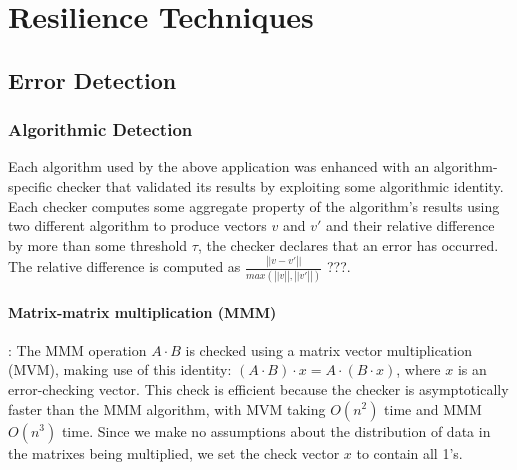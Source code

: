 \documentclass{sig-alternate}
\newcommand{\sui}[1]{%
  \textcolor{green}{SC - #1}
}
\begin{document}
\section{Resilience Techniques}
\label{sec:res_tech}

\subsection{Error Detection}
\label{sec:res_tech:err_det}

\subsubsection{Algorithmic Detection}
\label{sec:res_tech:err_det:algo}


Each algorithm used by the above application was enhanced with an algorithm-specific checker that validated its results by exploiting some algorithmic identity.
Each checker computes some aggregate property of the algorithm's results using two different algorithm to produce vectors $v$ and $v'$ and their relative difference by more than some threshold $\tau$, the checker declares that an error has occurred.
The relative difference is computed as $\frac{\left|| v-v' \right||}{max(\left||v\right||, \left||v'\right||)}$ ???.

\paragraph{Matrix-matrix multiplication (MMM)}:
The MMM operation $A \cdot B$ is checked using a matrix vector multiplication (MVM), making use of this identity: $(A \cdot B) \cdot x = A \cdot (B \cdot x)$, where $x$ is an error-checking vector.
This check is efficient because the checker is asymptotically faster than the MMM algorithm, with MVM taking $O(n^2)$ time and MMM $O(n^3)$ time.
Since we make no assumptions about the distribution of data in the matrixes being multiplied, we set the check vector $x$ to contain all 1's.
\end{document}
